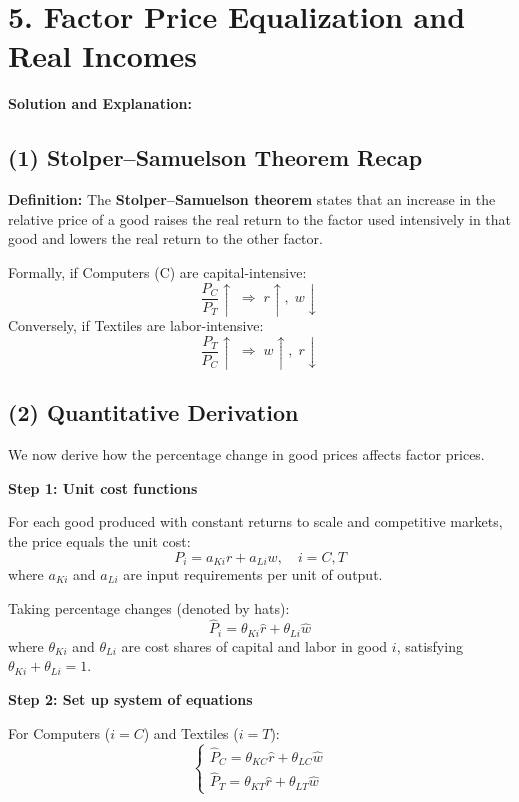 \documentclass[12pt]{article}
\begin{document}
\section*{5. Factor Price Equalization and Real Incomes}



\noindent\textbf{Solution and Explanation:}

\subsection*{(1) Stolper–Samuelson Theorem Recap}

\textbf{Definition:}  
The \textbf{Stolper–Samuelson theorem} states that an increase in the relative price of a good raises the real return to the factor used intensively in that good and lowers the real return to the other factor.

\noindent
Formally, if Computers (C) are capital-intensive:
\[
\frac{P_C}{P_T} \uparrow \; \Rightarrow \; r \uparrow, \; w \downarrow
\]
Conversely, if Textiles are labor-intensive:
\[
\frac{P_T}{P_C} \uparrow \; \Rightarrow \; w \uparrow, \; r \downarrow
\]

\subsection*{(2) Quantitative Derivation}

We now derive how the percentage change in good prices affects factor prices.

\textbf{Step 1: Unit cost functions}

For each good produced with constant returns to scale and competitive markets, the price equals the unit cost:
\[
P_i = a_{Ki} r + a_{Li} w, \quad i = C, T
\]
where \(a_{Ki}\) and \(a_{Li}\) are input requirements per unit of output.

Taking percentage changes (denoted by hats):
\[
\hat{P}_i = \theta_{Ki}\hat{r} + \theta_{Li}\hat{w}
\]
where \(\theta_{Ki}\) and \(\theta_{Li}\) are cost shares of capital and labor in good \(i\), satisfying \(\theta_{Ki} + \theta_{Li} = 1\).

\textbf{Step 2: Set up system of equations}

For Computers (\(i=C\)) and Textiles (\(i=T\)):
\[
\begin{cases}
\hat{P}_C = \theta_{KC}\hat{r} + \theta_{LC}\hat{w} \\
\hat{P}_T = \theta_{KT}\hat{r} + \theta_{LT}\hat{w}
\end{cases}
\]
\end{document}

